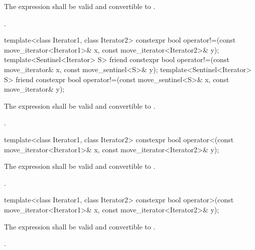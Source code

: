 \begin{itemdescr}
\pnum
\constraints
The expression  shall be valid and
convertible to .

\pnum
\returns {}.
\end{itemdescr}

%
\begin{itemdecl}
template<class Iterator1, class Iterator2>
  constexpr bool operator!=(const move_iterator<Iterator1>& x,
                            const move_iterator<Iterator2>& y);
template<Sentinel<Iterator> S>
  friend constexpr bool operator!=(const move_iterator& x,
                                   const move_sentinel<S>& y);
template<Sentinel<Iterator> S>
  friend constexpr bool operator!=(const move_sentinel<S>& x,
                                   const move_iterator& y);
\end{itemdecl}

\begin{itemdescr}
\pnum
\constraints
The expression  shall be valid and
convertible to .

\pnum
\returns {}.
\end{itemdescr}

%
\begin{itemdecl}
template<class Iterator1, class Iterator2>
constexpr bool operator<(const move_iterator<Iterator1>& x, const move_iterator<Iterator2>& y);
\end{itemdecl}

\begin{itemdescr}
\pnum
\constraints
The expression  shall be valid and
convertible to .

\pnum
\returns {}.
\end{itemdescr}

%
\begin{itemdecl}
template<class Iterator1, class Iterator2>
constexpr bool operator>(const move_iterator<Iterator1>& x, const move_iterator<Iterator2>& y);
\end{itemdecl}

\begin{itemdescr}
\pnum
\constraints
The expression  shall be valid and
convertible to .

\pnum
\returns {}.
\end{itemdescr}

